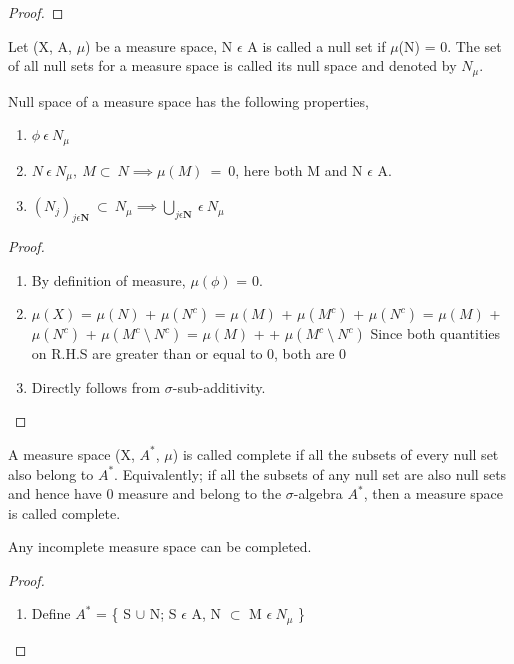 \begin{proof}
\end{proof}
\begin{definition}
    Let (X, A, $\mu$) be a measure space, N $\epsilon$ A is called a null set if
    $\mu$(N) = 0. The set of all null sets for a measure space is called its
    null space and denoted by $N_{\mu}$.
\end{definition}
\begin{lemma}
    Null space of a measure space has the following properties,
    \begin{enumerate}
        \item $\phi \: \epsilon \: N_{\mu}$
        \item $N \: \epsilon \: N_{\mu}, \: M \subset \: N \implies \mu(M) \: = \:
            0$, here both M and N $\epsilon$ A.
        \item $(N_j)_{j\epsilon\bm{N}} \: \subset \: N_\mu \implies
            \bigcup_{j\epsilon\bm{N}} \: \epsilon \: N_\mu$
    \end{enumerate}
\end{lemma}
\begin{proof}
    \begin{enumerate}
        \item By definition of measure, $\mu(\phi)$ = 0.
        \item $\mu(X)$ = $\mu(N)$ + $\mu(N^c)$ = $\mu(M)$ + $\mu(M^c)$
             + $\mu(N^c)$ = $\mu(M)$ + $\mu(N^c)$ + $\mu(M^c \:
            \setminus \: N^c)$
             = $\mu(M)$ +  + $\mu(M^c \: \setminus \: N^c)$
            \newline Since both quantities on R.H.S are greater than or equal
            to 0, both are 0
        \item Directly follows from $\sigma$-sub-additivity.

    \end{enumerate}
\end{proof}
\begin{definition}
    A measure space (X, $A^*$, $\mu$) is called complete if all the subsets of
    every null set also belong to $A^*$. Equivalently; if all the subsets of any
    null set are also null sets and hence have 0 measure and belong to the
    $\sigma$-algebra $A^*$, then a measure space is called complete.
\end{definition}
\begin{theorem}
    Any incomplete measure space can be completed.
\end{theorem}
\begin{proof}
    \begin{enumerate}
        \item Define $A^*$ = \{ S $\cup$ N; S $\epsilon$ A, N $\subset$ M
            $\epsilon \: N_\mu$ \}
    \end{enumerate}
\end{proof}

